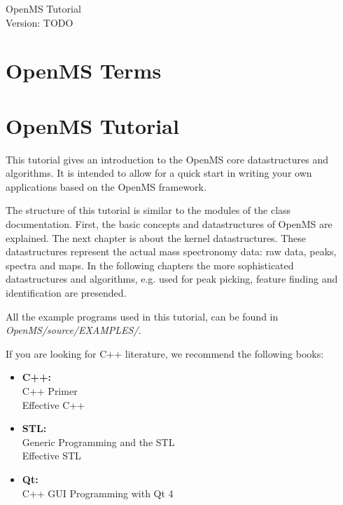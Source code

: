 \documentclass[a4paper]{article}
\begin{document}
\begin{titlepage}
\vspace*{7cm}
\begin{center}
{\Large OpenMS Tutorial\\[1ex]\large Version: TODO }\\
\end{center}
\end{titlepage}


\setcounter{tocdepth}{2}
\tableofcontents
\pagebreak

\section{OpenMS Terms}
	
	
	\pagebreak

\section{OpenMS Tutorial}

	This tutorial gives an introduction to the OpenMS core datastructures and algorithms.
	It is intended to allow for a quick start in writing your own applications based on
	the OpenMS framework.
	
	The structure of this tutorial is similar to the modules of the class documentation.
	First, the basic concepts and datastructures of OpenMS are explained. The next chapter is
	about the kernel datastructures. These datastructures represent the actual mass spectronomy
	data: raw data, peaks, spectra and maps. In the following chapters the more sophisticated 
	datastructures and algorithms, e.g. used for peak picking, feature finding and identification
	are presended.
	
	All the example programs used in this tutorial, can be found in {\em OpenMS/source/EXAMPLES/}.

	If you are looking for C++ literature, we recommend the following books:
	\begin{itemize}
		\item {\bf C++:}\\ C++ Primer\\ Effective C++
		\item {\bf STL:}\\ Generic Programming and the STL\\ Effective STL
		\item {\bf Qt:}\\ C++ GUI Programming with Qt 4
	\end{itemize}
	
	\pagebreak
	
	\pagebreak
	
	\pagebreak
	
	\pagebreak
	
	\pagebreak
	
	\pagebreak
	
	\pagebreak
	
	\pagebreak
	
\end{document}
